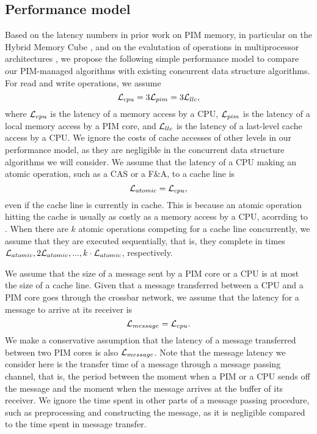 \subsection{Performance model}
\label{section:performance_model}
Based on the latency numbers in prior work on PIM memory, 
in particular on the Hybrid Memory Cube \cite{website:HMC, Azarkhish16}, 
and on the evalutation of operations in multiprocessor architectures \cite{David13},
we propose the following simple performance model to compare 
our PIM-managed algorithms with existing concurrent data structure algorithms.
For read and write operations, we assume 
$$\mathcal{L}_{cpu} = 3\mathcal{L}_{pim} = 3\mathcal{L}_{llc},$$
where $\mathcal{L}_{cpu}$ is the latency of a memory access by a CPU,
$\mathcal{L}_{pim}$ is the latency of a local memory access by a PIM core, and
$\mathcal{L}_{llc}$ is the latency of a last-level cache access by a CPU.
We ignore the costs of cache accesses of other levels in our performance model,
as they are negligible in the concurrent data structure algorithms we will consider.
We assume that the latency of a CPU making an atomic operation, such as a CAS or a F\&A,
to a cache line is 
$$\mathcal{L}_{atomic} = \mathcal{L}_{cpu},$$ 
even if the cache line is currently in cache.
This is because an atomic operation hitting the cache is usually 
as costly as a memory access by a CPU, acorrding to \cite{David13}.
When there are $k$ atomic operations competing for a cache line concurrently,
we assume that they are executed sequentially, that is,
they complete in times $\mathcal{L}_{atomic}, 2\mathcal{L}_{atomic},..., k\cdot\mathcal{L}_{atomic}$, respectively.

We assume that the size of a message sent by a PIM core or a CPU is at most 
the size of a cache line.
Given that a message transferred between a CPU and a PIM core goes through
the crossbar network, we assume that the latency for a message to arrive at its receiver is 
$$\mathcal{L}_{message} = \mathcal{L}_{cpu}.$$
We make a conservative assumption that the latency of a message transferred 
between two PIM cores is also $\mathcal{L}_{message}$.
Note that the message latency we consider here is the transfer time of a message
through a message passing channel, that is, the period between the moment
when a PIM or a CPU sends off the message and the moment when
the message arrives at the buffer of its receiver.
We ignore the time spent in other parts of a message passing procedure,
such as preprocessing and constructing the message,
as it is negligible compared to the time spent in message transfer.

